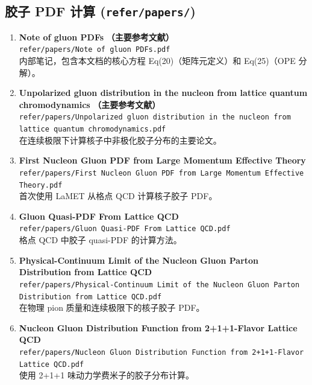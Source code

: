 \documentclass[12pt,a4paper]{ctexart}
\begin{document}
\subsection{胶子 PDF 计算 (\texttt{refer/papers/})}

\begin{enumerate}
    \item \textbf{Note of gluon PDFs} \hfill \textbf{（主要参考文献）} \\
    \texttt{refer/papers/Note of gluon PDFs.pdf} \\
    内部笔记，包含本文档的核心方程 Eq(20)（矩阵元定义）和 Eq(25)（OPE 分解）。

    \item \textbf{Unpolarized gluon distribution in the nucleon from lattice quantum chromodynamics} \hfill \textbf{（主要参考文献）} \\
    \texttt{refer/papers/Unpolarized gluon distribution in the nucleon from lattice quantum chromodynamics.pdf} \\
    在连续极限下计算核子中非极化胶子分布的主要论文。

    \item \textbf{First Nucleon Gluon PDF from Large Momentum Effective Theory} \\
    \texttt{refer/papers/First Nucleon Gluon PDF from Large Momentum Effective Theory.pdf} \\
    首次使用 LaMET 从格点 QCD 计算核子胶子 PDF。

    \item \textbf{Gluon Quasi-PDF From Lattice QCD} \\
    \texttt{refer/papers/Gluon Quasi-PDF From Lattice QCD.pdf} \\
    格点 QCD 中胶子 quasi-PDF 的计算方法。

    \item \textbf{Physical-Continuum Limit of the Nucleon Gluon Parton Distribution from Lattice QCD} \\
    \texttt{refer/papers/Physical-Continuum Limit of the Nucleon Gluon Parton Distribution from Lattice QCD.pdf} \\
    在物理 pion 质量和连续极限下的核子胶子 PDF。

    \item \textbf{Nucleon Gluon Distribution Function from 2+1+1-Flavor Lattice QCD} \\
    \texttt{refer/papers/Nucleon Gluon Distribution Function from 2+1+1-Flavor Lattice QCD.pdf} \\
    使用 2+1+1 味动力学费米子的胶子分布计算。


\end{enumerate}
\end{document}
